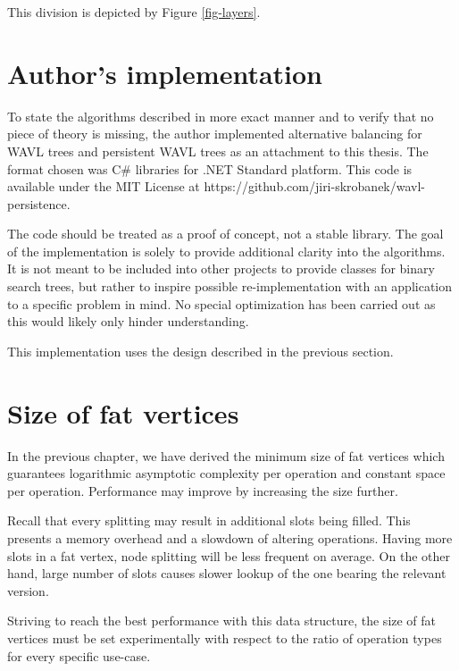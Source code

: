 This division is depicted by Figure \ref{fig-layers}.



\section{Author's implementation}

To state the algorithms described in more exact manner and to verify that no piece of theory is missing, the author implemented alternative balancing for WAVL trees and persistent WAVL trees as an attachment to this thesis. 
The format chosen was C\# libraries for .NET Standard platform. 
This code is available under the MIT License at\linebreak
{\ttfamily https://github.com/jiri-skrobanek/wavl-persistence}.

The code should be treated as a proof of concept, not a stable library. The goal of the implementation is solely to provide additional clarity into the algorithms. 
It is not meant to be included into other projects to provide classes for binary search trees, but rather to inspire possible re-implementation with an application to a specific problem in mind.
No special optimization has been carried out as this would likely only hinder understanding. 

This implementation uses the design described in the previous section.

\section{Size of fat vertices}

In the previous chapter, we have derived the minimum size of fat vertices which guarantees logarithmic asymptotic complexity per operation and constant space per operation. 
Performance may improve by increasing the size further.

Recall that every splitting may result in additional slots being filled. 
This presents a memory overhead and a slowdown of altering operations. 
Having more slots in a fat vertex, node splitting will be less frequent on average. 
On the other hand, large number of slots causes slower lookup of the one bearing the relevant version. 

Striving to reach the best performance with this data structure, the size of fat vertices must be set experimentally with respect to the ratio of operation types for every specific use-case.
